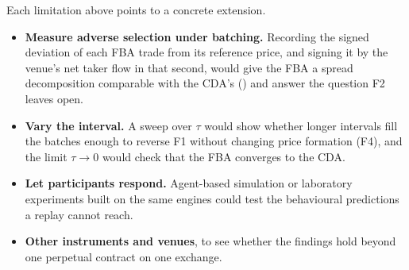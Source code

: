 Each limitation above points to a concrete extension.
\begin{itemize}
  \item \textbf{Measure adverse selection under batching.} Recording the
  signed deviation of each FBA trade from its reference price, and signing
  it by the venue's net taker flow in that second, would give the FBA a
  spread decomposition comparable with the CDA's ()
  and answer the question F2 leaves open.
  \item \textbf{Vary the interval.} A sweep over $\tau$ would show whether
  longer intervals fill the batches enough to reverse F1 without changing
  price formation (F4), and the limit
  $\tau \to 0$ would check that the FBA converges to the CDA.
  \item \textbf{Let participants respond.} Agent-based simulation or
  laboratory experiments built on the same engines could test the
  behavioural predictions a replay cannot reach.
  \item \textbf{Other instruments and venues}, to see whether the findings
  hold beyond one perpetual contract on one exchange.
\end{itemize}
